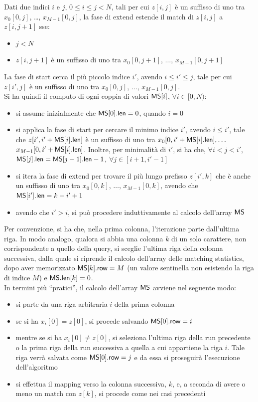 Dati due indici $i$ e $j$, $0\leq i\leq j< N$, tali per cui
$z[i,j]$ è un suffisso di uno tra $x_0[0,j]$, \ldots, $x_{M-1}[0,j]$,
la fase di extend estende il match di $z[i,j]$ a $z[i,j+1]$ sse:
\begin{itemize}
  \item $j<N$
  \item $z[i,j+1]$ è un suffisso di uno tra $x_0[0,j+1]$, $\ldots$,
  $x_{M-1}[0,j+1]$ 
\end{itemize}
La fase di start cerca il più piccolo indice $i'$,
avendo $i\leq i'\leq j$, tale per cui $z[i',j]$ è un suffisso di uno tra
$x_0[0,j]$, $\ldots$, $x_{M-1}[0,j]$.\\
Si ha quindi il computo di ogni coppia di valori $\mbox{\rm {\sf MS}}[i]$, $\forall i\in[0,N)$:
\begin{itemize}
  \item si assume inizialmente che $\mbox{\rm {\sf MS}}[0].\mbox{\rm {\sf len}}=0$, quando $i=0$
  \item si applica la fase di start per cercare il minimo indice
  $i'$, avendo $i\leq i'$, tale che $z[i',i'+\mbox{\rm {\sf MS}}[i].\mbox{\rm {\sf len}}]$ è un suffisso di uno
  tra $x_0[0,i'+\mbox{\rm {\sf MS}}[i].\mbox{\rm {\sf len}}], \ldots$ $x_{M-1}[0,i'+\mbox{\rm {\sf MS}}[i].\mbox{\rm {\sf len}}]$. Inoltre, per
  minimalità di $i'$, si ha che, $\forall i<j<i'$,
  $\mbox{\rm {\sf MS}}[j].\mbox{\rm {\sf len}}=\mbox{\rm {\sf MS}}[j-1].\mbox{\rm {\sf len}}-1$, $\forall j\in[i+1,i'-1]$
  \item si itera la fase di extend per trovare il
  più lungo prefisso $z[i',k]$ che è anche un suffisso di uno tra $x_0[0,k]$,
  $\ldots$, $x_{M-1}[0,k]$, avendo che $\mbox{\rm {\sf MS}}[i'].\mbox{\rm {\sf len}}=k-i'+1$
  \item avendo che $i'>i$, si può procedere induttivamente al calcolo dell'array
  $\mbox{\rm {\sf MS}}$ 
\end{itemize}
Per convenzione, si ha che, nella prima colonna, l'iterazione parte dall'ultima
riga. 
In modo analogo, qualora si abbia una colonna $k$ di un solo carattere, non
corrispondente a quello della query, si sceglie l'ultima riga della
colonna successiva, dalla quale si riprende il calcolo  
dell'array delle matching statistics, dopo aver memorizzato $\mbox{\rm {\sf MS}}[k].\mbox{\rm {\sf row}}=M$
(un valore sentinella non esistendo la riga di indice $M$) e $\mbox{\rm {\sf MS}}.\mbox{\rm {\sf len}}[k]=0$.\\
In termini più ``pratici'', il calcolo dell'array $\mbox{\rm {\sf MS}}$ avviene nel
seguente modo:
\begin{itemize}
  \item si parte da una riga arbitraria $i$ della prima colonna
  \item se si ha $x_i[0]=z[0]$, si procede salvando $\mbox{\rm {\sf MS}}[0].\mbox{\rm {\sf row}}=i$
  \item mentre se si ha $x_i[0]\neq z[0]$, si seleziona l'ultima riga della
  run precedente o la prima riga della run successiva a quella a cui appartiene
  la riga $i$. Tale riga verrà salvata come $\mbox{\rm {\sf MS}}[0].\mbox{\rm {\sf row}}=j$ e da essa si
  proseguirà l'esecuzione dell'algoritmo
  \item si effettua il mapping verso la colonna successiva, $k$,
  e, a seconda di avere o meno un match con $z[k]$, si procede come nei casi
  precedenti
\end{itemize}
